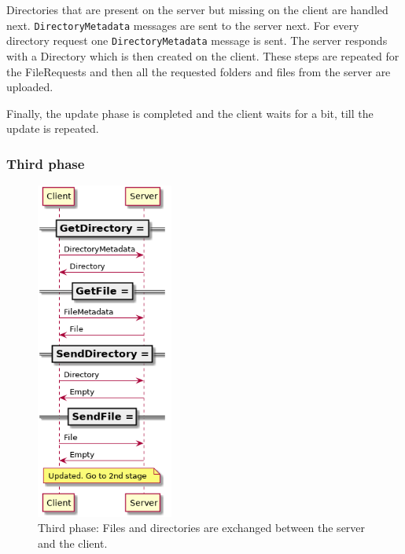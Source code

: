 \documentclass[a4paper]{article}
\begin{document}
Directories that are present on the server but missing on the client are handled next. \texttt{DirectoryMetadata} messages are sent to the server next. For every directory request one \texttt{DirectoryMetadata} message is sent. The server responds with a Directory which is then created on the client. These steps are repeated for the FileRequests and then all the requested folders and files from the server are uploaded.

Finally, the update phase is completed and the client waits for a bit, till the update is repeated.


\subsubsection{Third phase}
\begin{figure}[H]
\centering
\includegraphics[width=4.5cm]{third_stage}
\caption{Third phase: Files and directories are exchanged between the server and the client.}
\end{figure}
\end{document}
